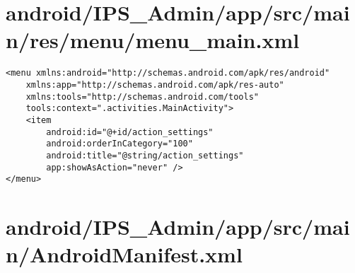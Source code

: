 \section{android/IPS\_Admin/app/src/main/res/menu/menu_main.xml}
\begin{lstlisting}<menu xmlns:android="http://schemas.android.com/apk/res/android"
    xmlns:app="http://schemas.android.com/apk/res-auto"
    xmlns:tools="http://schemas.android.com/tools"
    tools:context=".activities.MainActivity">
    <item
        android:id="@+id/action_settings"
        android:orderInCategory="100"
        android:title="@string/action_settings"
        app:showAsAction="never" />
</menu>
\end{lstlisting}
\newpage
\section{android/IPS\_Admin/app/src/main/AndroidManifest.xml}
